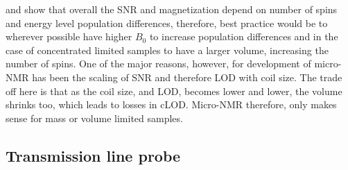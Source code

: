 and  show that overall the SNR and
magnetization depend on number of spins and energy level population differences, therefore, best practice
would be to wherever possible have higher $B_0$ to increase population differences and in the case of
concentrated limited samples to have a larger volume, increasing the number of spins.
One of the major reasons, however, for development of micro-NMR has been the scaling of SNR and therefore LOD
with coil size. The trade off here is that as the coil size, and LOD, becomes lower and lower, the
volume shrinks too, which leads to losses in cLOD. Micro-NMR therefore, only makes sense for mass
or volume limited samples.


\subsection{Transmission line probe}

